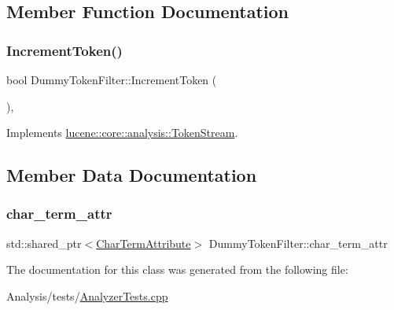 \subsection{Member Function Documentation}
\mbox{\label{classDummyTokenFilter_a6a57ec2684cc58f61ec807bbebabae63}} 
\subsubsection{\texorpdfstring{Increment\+Token()}{IncrementToken()}}
{\footnotesize\ttfamily bool Dummy\+Token\+Filter\+::\+Increment\+Token (\begin{DoxyParamCaption}{ }\end{DoxyParamCaption})\hspace{0.3cm}{\ttfamily [inline]}, {\ttfamily [virtual]}}



Implements \mbox{\hyperlink{classlucene_1_1core_1_1analysis_1_1TokenStream_a614d4ea24a354d6f4354b4941b5124e2}{lucene\+::core\+::analysis\+::\+Token\+Stream}}.



\subsection{Member Data Documentation}
\mbox{\label{classDummyTokenFilter_ab057e032de3b055c554c4ab4abf1c3da}} 
\subsubsection{\texorpdfstring{char\+\_\+term\+\_\+attr}{char\_term\_attr}}
{\footnotesize\ttfamily std\+::shared\+\_\+ptr$<$\mbox{\hyperlink{classlucene_1_1core_1_1analysis_1_1tokenattributes_1_1CharTermAttribute}{Char\+Term\+Attribute}}$>$ Dummy\+Token\+Filter\+::char\+\_\+term\+\_\+attr}



The documentation for this class was generated from the following file\+:\begin{DoxyCompactItemize}
\item 
Analysis/tests/\mbox{\hyperlink{AnalyzerTests_8cpp}{Analyzer\+Tests.\+cpp}}\end{DoxyCompactItemize}
